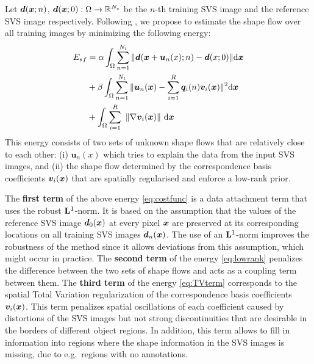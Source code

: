 Let $\bm{d}(\boldsymbol{x};n)$, $\bm{d}(\boldsymbol{x};0):\Omega\rightarrow \mathbb{R}^{N_c}$ be the $n$-th training SVS image and the reference SVS image respectively. Following \cite{Garg:2013hu}, we propose to estimate the shape flow over all training images by minimizing the following energy:
\vspace{-5pt}
\begin{align}
E_{sf} & =\alpha
\int_{\Omega}\sum_{n=1}^{N_t} \|\bm{d}(\bx+\bm{u}_n(x);n)-\bm{d}(x;0)\| \ud \bx \label{eq:costfunc}\\
    &+ \beta \int_{\Omega}\sum_{n=1}^{N_t}\|\bm{u}_n(\bx)-\sum_{i=1}^R\bm{q}_i(n)\bm{v}_i(\bx)\|^2 \ud \bx \label{eq:lowrank}\\
    &+
\int_\Omega  \sum_{i=1}^R \,\, \left \|    \nabla \bm{v}_i(\bx)    \right \|  \,\ud \bx \label{eq:TVterm}
\vspace{-5pt}
\end{align}
This energy consists of two sets of unknown shape flows that are relatively close to each other: (i) $\bm{u}_n(x)$ which tries to explain the data from the input SVS images, and (ii) the shape flow determined by the correspondence basis coefficients $\bm{v}_i(\boldsymbol{x})$ that are spatially regularised and enforce a low-rank prior.


The \textbf{first term} of the above energy \eqref{eq:costfunc} is a data attachment term
that uses the robust $\mathbf{L}^1$-norm.  It is based on the assumption that the values of the reference SVS image $\bm{d}_0(\boldsymbol{x})$ at every pixel $\boldsymbol{x}$ are preserved at its corresponding locations on all training SVS images $\bm{d}_n(\boldsymbol{x})$. The use of an $\mathbf{L}^1$-norm improves the robustness of the method since it allows deviations from this assumption, which might occur in practice.
The \textbf{second term} of the energy \eqref{eq:lowrank} penalizes the difference between the two sets  of shape flows and acts as a coupling term between them.
The \textbf{third term} of the energy \eqref{eq:TVterm} corresponds to the spatial Total Variation regularization \cite{rudin92} of
the correspondence basis coefficients $\bm{v}_i(\boldsymbol{x})$.
This term penalizes spatial oscillations of each coefficient caused by distortions of the SVS images but not strong discontinuities that are desirable in the borders of different object regions. In addition, this term allows to fill in information into regions where the shape information in the SVS images is missing, due to e.g.~regions with no annotations.

